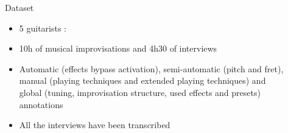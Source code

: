 \documentclass[final]{beamer}
\newlength{\sepwid}
\newlength{\onecolwid}
\newcommand{\fatskip}{\vspace{3cm}}
\begin{document}
\begin{frame}[t]
\begin{columns}[t]
\begin{column}{\onecolwid}
\end{column} %

\begin{column}{\sepwid}\end{column} %



\begin{column}{\onecolwid} %

\fatskip
\begin{block}{Dataset}


\begin{itemize}
    \item 5 guitarists : 
    \item 10h of musical improvisations and 4h30 of interviews
    \item Automatic (effects bypass activation), semi-automatic (pitch and fret), manual  (playing techniques and extended playing techniques) and global (tuning, improvisation structure, used effects and presets) annotations
    \item All the interviews have been transcribed
\end{itemize}



\end{block}
\end{column}
\end{columns}
\end{frame}
\end{document}
